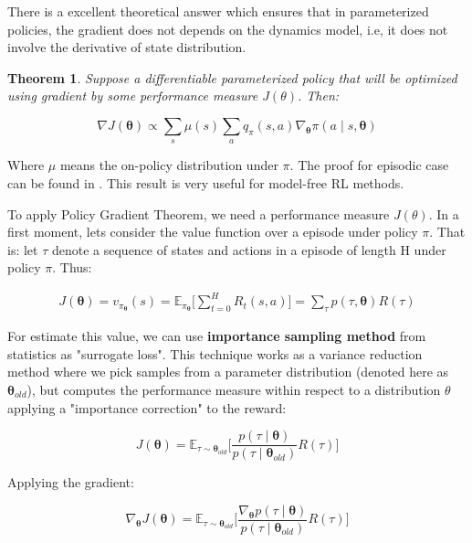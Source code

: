 There is a excellent theoretical answer which ensures that in parameterized policies, the gradient does not depends on the dynamics model, i.e, it does not involve the derivative of state distribution.

\newtheorem{pg}{Theorem}
\begin{pg}
	Suppose a differentiable parameterized policy that will be optimized using gradient by some performance measure $J(\theta)$. Then:
	
	\begin{equation}
	\nabla J(\boldsymbol{\theta}) \propto \sum_{s}\mu(s)\sum_{a} q_{\pi}(s, a)\nabla_{\boldsymbol{\theta}} \pi(a \mid s, \boldsymbol{\theta})
	\end{equation}
\end{pg}

Where $\mu$ means the on-policy distribution under $\pi$. The proof for episodic case can be found in \cite{sutton1998rli}. This result is very useful for model-free RL methods.

To apply Policy Gradient Theorem, we need a performance measure $J(\theta)$. In a first moment, lets consider the value function over a episode under policy $\pi$. That is: let $\tau$ denote a sequence of states and actions in a episode of length H under policy $\pi$. Thus:

\begin{align}
J(\boldsymbol{\theta})  = v_{\pi_{\boldsymbol{\theta}}}(s)
 = \mathbb{E}_{\pi_{\boldsymbol{\theta}}}\Bigg[ \sum_{t = 0}^{H}R_{t}(s, a) \Bigg] = \sum_{\tau} p(\tau, \boldsymbol{\theta}) R(\tau)
\end{align}

For estimate this value, we can use \textbf{importance sampling method} \cite{NIPS2010_3922} from statistics as "surrogate loss". This technique works as a variance reduction method where we pick samples from a parameter distribution (denoted here as $\boldsymbol{\theta}_{old}$), but computes the performance measure within respect to a distribution $\theta$ applying a "importance correction" to the reward:

\begin{equation}\label{eq:optloss1}
J(\boldsymbol{\theta}) = \mathbb{E}_{\tau \sim \boldsymbol{\theta}_{old}} \Bigg[\frac{p(\tau \mid \boldsymbol{\theta})}{p(\tau \mid \boldsymbol{\theta}_{old})}R(\tau) \Bigg]
\end{equation}

Applying the gradient:

\begin{equation}
\nabla_{\boldsymbol{\theta}} J(\boldsymbol{\theta}) = \mathbb{E}_{\tau \sim \boldsymbol{\theta}_{old}} \Bigg[\frac{\nabla_{\boldsymbol{\theta}} p(\tau \mid \boldsymbol{\theta})}{p(\tau \mid \boldsymbol{\theta}_{old})}R(\tau) \Bigg]
\end{equation}


